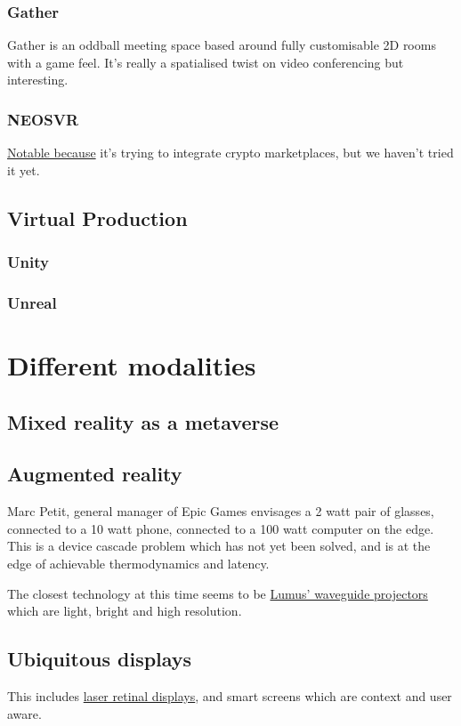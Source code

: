 \subsubsection{Gather}
Gather is an oddball meeting space based around fully customisable 2D rooms with a game feel. It's really a spatialised twist on video conferencing but interesting.  
\subsubsection{NEOSVR}
\href{https://neos.com/}{Notable because} it's trying to integrate crypto marketplaces, but we haven't tried it yet.
\subsection{Virtual Production}
\subsubsection{Unity}
\subsubsection{Unreal}
\section{Different modalities}
\subsection{Mixed reality as a metaverse}

\subsection{Augmented reality}
Marc Petit, general manager of Epic Games envisages a 2 watt pair of glasses, connected to a 10 watt phone, connected to a 100 watt computer on the edge. This is a device cascade problem which has not yet been solved, and is at the edge of achievable thermodynamics and latency.\par
The closest technology at this time seems to be \href{https://lumusvision.com/}{Lumus' waveguide projectors} which are light, bright and high resolution. 
\subsection{Ubiquitous displays}
This includes \href{https://skarredghost.com/2022/06/28/mojo-vision-contact-tested-eye/}{laser retinal displays}, and smart screens which are context and user aware.
